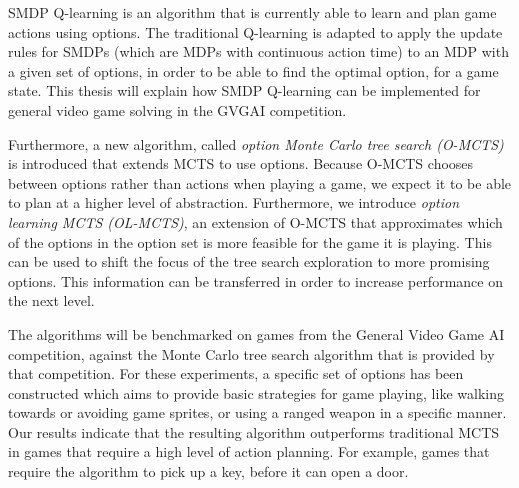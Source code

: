 SMDP Q-learning is an algorithm that is currently able to learn and plan game
actions using options. The traditional Q-learning is adapted to apply the update
rules for SMDPs (which are MDPs with continuous action time) to an MDP with a
given set of options, in order to be able to find the optimal option, for a game
state. This thesis will explain how SMDP Q-learning can be implemented for
general video game solving in the GVGAI competition.

Furthermore, a new algorithm, called \emph{option Monte Carlo tree search (O-MCTS)} is introduced
that extends MCTS to use options. Because O-MCTS chooses between options rather
than actions when playing a game, we expect it to be able to plan at a higher
level of abstraction. Furthermore, we introduce \emph{option learning MCTS
(OL-MCTS)}, an extension of O-MCTS that approximates which of the options in the
option set is more feasible for the game it is playing. This can be used to
shift the focus of the tree search exploration to more promising options. This
information can be transferred in order to increase performance on the next
level.

The algorithms will be benchmarked on games from the General Video Game AI
competition, against the Monte Carlo tree search algorithm that is
provided by that competition. For these experiments, a specific set of options
has been constructed which aims to provide basic strategies for game playing,
like walking towards or avoiding game sprites, or using a ranged weapon in a
specific manner. Our results indicate that the resulting algorithm outperforms
traditional MCTS in games that require a high level of action planning. For
example, games that require the algorithm to pick up a key, before it can open a
door. 

